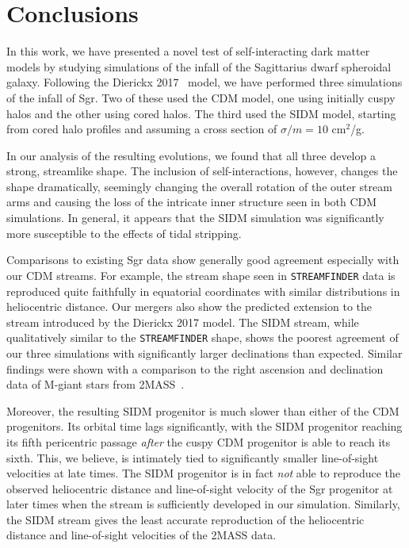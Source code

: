 \hypertarget{conclusions}{%
\chapter{Conclusions}\label{conclusions}}


In this work, we have presented a novel test of self-interacting dark matter
models by studying simulations of the infall of the Sagittarius dwarf
spheroidal galaxy.  Following the Dierickx 2017~\cite{dierickx_predicted_2017}
model, we have performed three simulations of the infall of Sgr.  Two of these
used the CDM model, one using initially cuspy halos and the other using cored
halos.  The third used the SIDM model, starting from cored halo profiles and
assuming a cross section of $\sigma/m = 10$ cm$^2$/g.

In our analysis of the resulting evolutions, we found that all three develop a
strong, streamlike shape.  The inclusion of self-interactions, however,
changes the shape dramatically, seemingly changing the overall rotation of the
outer stream arms and causing the loss of the intricate inner structure seen
in both CDM simulations.  In general, it appears that the SIDM simulation was
significantly more susceptible to the effects of tidal stripping.

Comparisons to existing Sgr data show generally good agreement especially with
our CDM streams.  For example, the stream shape seen in
\verb|STREAMFINDER| \cite{ibata_panoramic_2020} data is reproduced quite
faithfully in equatorial coordinates with similar distributions in
heliocentric distance.  Our mergers also show the predicted extension to the
stream introduced by the Dierickx 2017 model.  The SIDM stream, while
qualitatively similar to the \verb|STREAMFINDER| shape, shows the poorest
agreement of our three simulations with significantly larger declinations than
expected.  Similar findings were shown with a comparison to the right
ascension and declination data of M-giant stars from
2MASS~\cite{majewski_two_2003}.

Moreover, the resulting SIDM progenitor is much slower than either of the CDM
progenitors.  Its orbital time lags significantly, with the SIDM progenitor
reaching its fifth pericentric passage \textit{after} the cuspy CDM progenitor
is able to reach its sixth.  This, we believe, is intimately tied to
significantly smaller line-of-sight velocities at late times.  The SIDM
progenitor is in fact \textit{not} able to reproduce the observed heliocentric
distance and line-of-sight velocity of the Sgr progenitor at later times when
the stream is sufficiently developed in our simulation. Similarly, the SIDM
stream gives the least accurate reproduction of the heliocentric distance and
line-of-sight velocities of the 2MASS data.

